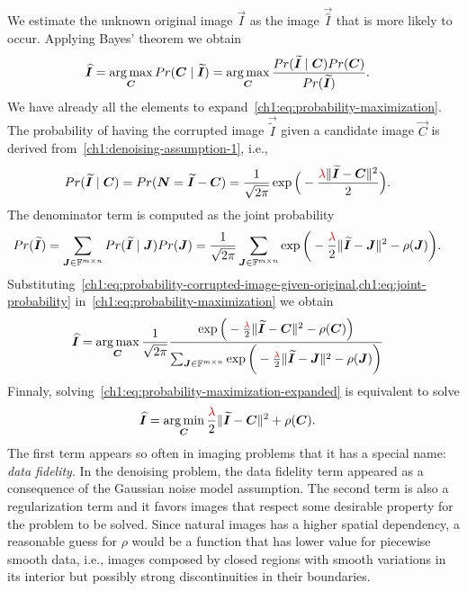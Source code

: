  We estimate the unknown original image $\vec{I}$ as the image $\vec{\widehat{I}}$ that is more likely to occur. Applying Bayes' theorem we obtain
\begin{align}
	\bm{\widehat{I}} & = \operatorname*{arg\,max} _{\bm{C}}{Pr(\bm{C} \; | \;\bm{\widetilde{I}})} = \operatorname*{arg\,max} _{\bm{C}} \frac{Pr(\bm{\widetilde{I}} \; | \; \bm{C})Pr(\bm{C})}{Pr(\bm{\widetilde{I}})}.
	\label{ch1:eq:probability-maximization}
\end{align}
%
We have already all the elements to expand~\cref{ch1:eq:probability-maximization}. The probability of having the corrupted image $\vec{\widetilde{I}}$ given a candidate image $\vec{C}$ is derived from~\cref{ch1:denoising-assumption-1}, i.e.,
\begin{align}
	Pr(\bm{\widetilde{I}} \; | \; \bm{C}) &= Pr( \bm{N} = \bm{\widetilde{I}} - \bm{C} ) = \frac{1}{\sqrt{2\pi}}\exp\Big(- \frac{ {\color{red}{ \lambda }}\lVert\bm{\widetilde{I}} - \bm{C} \rVert^2}{2} \Big).
	\label{ch1:eq:probability-corrupted-image-given-original}
\end{align}
%
The denominator term is computed as the joint probability
\begin{align}
	Pr(\widetilde{\bm{I}}) &= \sum_{\bm{J} \in \mathbb{F}^{m \times n}}{Pr(\bm{\widetilde{I}}\;|\; \bm{J})Pr(\bm{J})} = \frac{1}{\sqrt{2 \pi}}\sum_{\bm{J} \in \mathbb{F}^{m \times n}}{\exp\bigg(-\frac{{\color{red}{ \lambda }}}{2}\lVert\widetilde{\bm{I}}-\bm{J}\rVert^2 - \rho(\bm{J})}\bigg).
	\label{ch1:eq:joint-probability}
\end{align}
%
Substituting~\cref{ch1:eq:probability-corrupted-image-given-original,ch1:eq:joint-probability} in~\cref{ch1:eq:probability-maximization} we obtain
\begin{align}
	\bm{\widehat{I}} & = \operatorname*{arg\,max} _{\bm{C}} \frac{1}{\sqrt{2\pi}} \frac{\exp\Big(- \frac{{\color{red}{ \lambda }}}{2}\lVert\bm{\widetilde{I}} - \bm{C}\rVert^2 - \rho(\bm{C}) \Big) }{ \sum_{\bm{J} \in \mathbb{F}^{m \times n}}{\exp\bigg(-\frac{{\color{red}{ \lambda }}}{2}\lVert\widetilde{\bm{I}}-\bm{J}\rVert^2 - \rho(\bm{J})}\bigg) }
	\label{ch1:eq:probability-maximization-expanded}
\end{align}
%
Finnaly, solving~\cref{ch1:eq:probability-maximization-expanded} is equivalent to solve
\begin{align}
	\bm{\widehat{I}} &= \operatorname*{arg\,min} _{\bm{C}} \frac{{\color{red}{ \lambda }}}{2}\lVert\bm{\widetilde{I}} - \bm{C}\rVert^2 + \rho(\bm{C}).
	\label{ch1:eq:minimization-form}
\end{align}
%
The first term appears so often in imaging problems that it has a special name: \emph{data fidelity}. In the denoising problem, the data fidelity term appeared as a consequence of the Gaussian noise model assumption. The second term is also a regularization term and it favors images that respect some desirable property for the problem to be solved. Since natural images has a higher spatial dependency, a reasonable guess for $\rho$ would be a function that has lower value for piecewise smooth data, i.e., images composed by closed regions with smooth variations in its interior but possibly strong discontinuities in their boundaries. 


